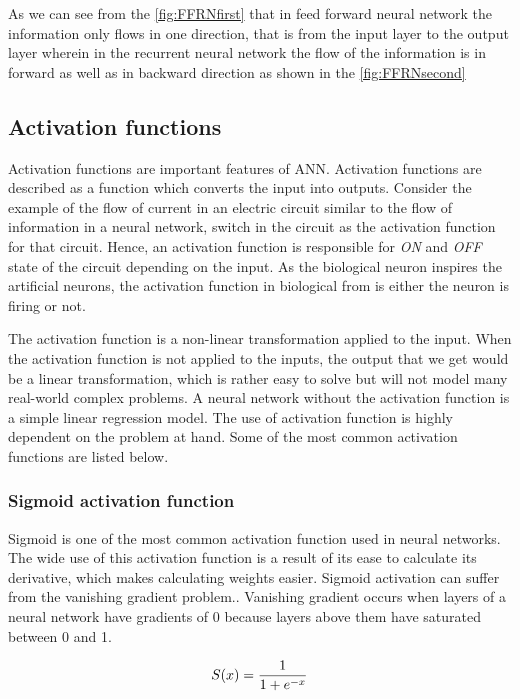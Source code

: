 As we can see from the \ref{fig:FFRNfirst} that in feed forward neural network the information only flows in one direction, that is from the input layer to the output layer wherein in the recurrent neural network the flow of the information is in forward as well as in backward direction as shown in the  \ref{fig:FFRNsecond}

\subsection*{Activation functions}
Activation functions are important features of \gls{ANN}. Activation functions are described as a function which converts the input into outputs. Consider the example of the flow of current in an electric circuit similar to the flow of information in a neural network, switch in the circuit as the activation function for that circuit. Hence, an activation function is responsible for \textit{ON} and \textit{OFF} state of the circuit depending on the input. As the biological neuron inspires the artificial neurons, the activation function in biological from is either the neuron is firing or not.   

The activation function is a non-linear transformation applied to the input. When the activation function is not applied to the inputs, the output that we get would be a linear transformation, which is rather easy to solve but will not model many real-world complex problems. A neural network without the activation function is a simple linear regression model. The use of activation function is highly dependent on the problem at hand. Some of the most common activation functions are listed below.

\subsubsection*{Sigmoid activation function}
Sigmoid is one of the most common activation function used in neural networks. The wide use of this activation function is a result of its ease to calculate its derivative, which makes calculating weights easier. Sigmoid activation can suffer from the vanishing gradient problem.\cite{bengio1994learning}. Vanishing gradient occurs when layers of a neural network have gradients of $0$ because layers above them have saturated between 0 and 1. \cite{maas2013rectifier}


\begin{equation}
S(x) = \frac{1}{1+e^{-x}} \\
\label{eq:sig}
\end{equation}

